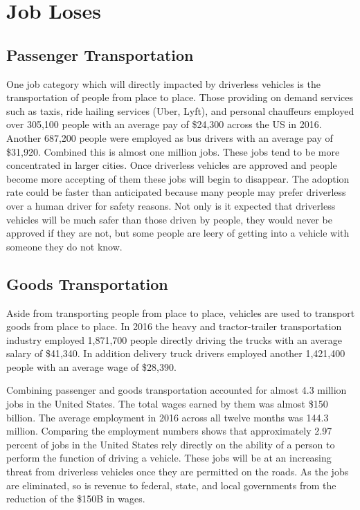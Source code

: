 \documentclass[sigconf]{acmart}
\begin{document}
\section{Job Loses}
\subsection{Passenger Transportation}

One job category which will directly impacted by driverless vehicles is the 
transportation of people from place to place.  Those providing on demand 
services such as taxis, ride hailing services (Uber, Lyft), and personal 
chauffeurs employed over 305,100 people with an average pay of \$24,300 across 
the US in 2016.\cite{BLSOnDemandDrivers}  Another 687,200 people were employed as 
bus drivers with an average pay of \$31,920.\cite{BLSBusDrivers}  Combined this is 
almost one million jobs.  These jobs tend to be more concentrated in larger 
cities.  Once driverless vehicles are approved and people become more accepting 
of them these jobs will begin to disappear.  The adoption rate could be faster 
than anticipated because many people may prefer driverless over a human driver 
for safety reasons.  Not only is it expected that driverless vehicles will be 
much safer than those driven by people, they would never be approved if they 
are not, but some people are leery of getting into a vehicle with someone they 
do not know.  
  
\subsection{Goods Transportation}

Aside from transporting people from place to place, vehicles are used to 
transport goods from place to place.  In 2016 the heavy and tractor-trailer 
transportation industry employed 1,871,700 people directly driving the trucks 
with an average salary of \$41,340.\cite{BLSBigTrucks}  In addition delivery 
truck drivers employed another 1,421,400 people with an average wage of 
\$28,390.\cite{BLSDeliveryDrivers}  

Combining passenger and goods transportation accounted for almost 4.3 million 
jobs in the United States.  The total wages earned by them was almost \$150 
billion.  The average employment in 2016 across all twelve months was 144.3 
million.\cite{BLSUSEmployment}  Comparing the employment numbers shows that 
approximately 2.97 percent of jobs in the United States rely directly on the 
ability of a person to perform the function of driving a vehicle.  These jobs 
will be at an increasing threat from driverless vehicles once they are permitted 
on the roads.  As the jobs are eliminated, so is revenue to federal, state, and 
local governments from the reduction of the \$150B in wages.
\end{document}
